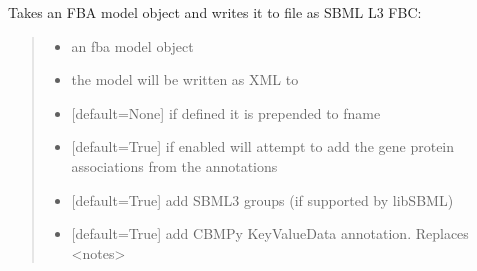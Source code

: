 \documentclass[letterpaper,12pt,english]{sphinxmanual}
\begin{document}
\begin{fulllineitems}

\pysigstartsignatures
\pysiglinewithargsret
{}
{\sphinxparamcomma {}\sphinxparamcomma {}\sphinxparamcomma {}\sphinxparamcomma {}\sphinxparamcomma {}\sphinxparamcomma {}\sphinxparamcomma {}}
{}
\pysigstopsignatures
\sphinxAtStartPar
Takes an FBA model object and writes it to file as SBML L3 FBC:
\begin{quote}\begin{description}
\begin{itemize}
\item {} 
\sphinxAtStartPar
{} \textendash{} an fba model object

\item {} 
\sphinxAtStartPar
{} \textendash{} the model will be written as XML to 

\item {} 
\sphinxAtStartPar
{} \textendash{} {[}default=None{]} if defined it is prepended to fname

\item {} 
\sphinxAtStartPar
{} \textendash{} {[}default=True{]} if enabled will attempt to add the gene protein associations from the annotations

\item {} 
\sphinxAtStartPar
{} \textendash{} {[}default=True{]} add SBML3 groups (if supported by libSBML)

\item {} 
\sphinxAtStartPar
{} \textendash{} {[}default=True{]} add CBMPy KeyValueData annotation. Replaces \textless{}notes\textgreater{}


\end{itemize}
\end{description}
\end{quote}
\end{fulllineitems}
\end{document}
